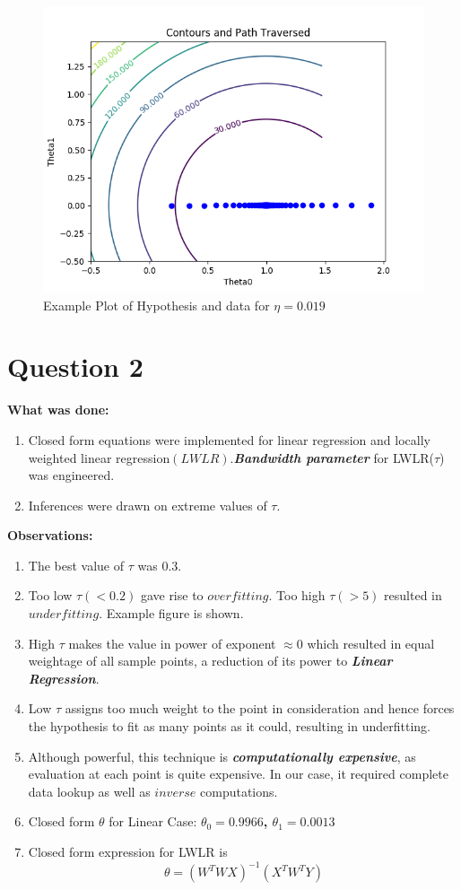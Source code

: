 \documentclass{article}
\newcommand{\bld}[1]{\textbf{#1}}
\newcommand{\italb}[1]{\textbf{\textit{#1}}}
\begin{document}
\newpage

\begin{figure}
\vspace*{-2cm}
\centering
\includegraphics{Contours2.png}
\caption{Example Plot of Hypothesis and data for $\eta=0.019$}
\end{figure}

\section*{Question 2}
\bld{What was done:}
\begin{enumerate}
\item Closed form equations were implemented for linear regression and locally weighted linear regression$(LWLR)$.\italb{Bandwidth parameter} for LWLR($\tau$) was engineered.
\item Inferences were drawn on extreme values of $\tau$.
\end{enumerate}  

\bld{Observations:}
\begin{enumerate}
	\item The best value of $\tau$ was 0.3.
	\item Too low $\tau(<0.2)$ gave rise to $overfitting$. Too high $\tau(>5)$ resulted in $underfitting$. Example figure is shown.
	\item High $\tau$ makes the value in power of exponent $\approx 0$ which resulted in equal weightage of all sample points, a reduction of its power to \italb{Linear Regression}.
	\item Low $\tau$ assigns too much weight to the point in consideration and hence forces the hypothesis to fit as many points as it could, resulting in underfitting.
	\item Although powerful, this technique is \italb{computationally expensive}, as evaluation at each point is quite expensive. In our case, it required complete data lookup as well as $inverse$ computations.
	\item Closed form $\theta$ for Linear Case: \textbf{$\theta_0=0.9966$, $\theta_1=0.0013$}
	\item Closed form expression for LWLR is $$\theta=(W^TWX)^{-1}(X^TW^TY)$$
\end{enumerate}
\end{document}
